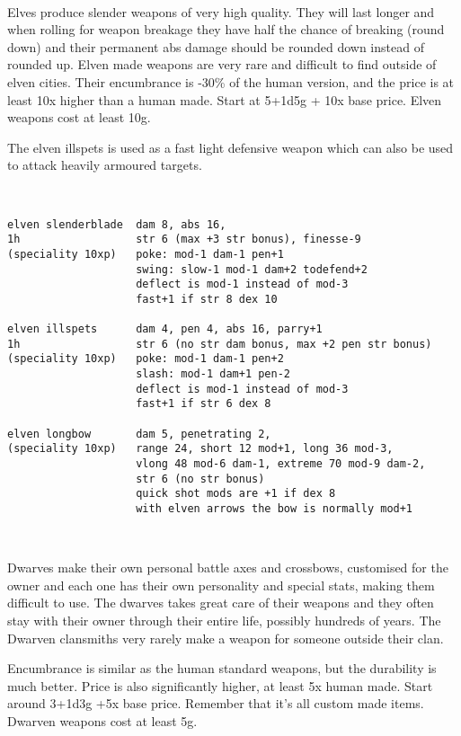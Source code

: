 \

\goodbreak
\noindent Elves produce slender weapons of very high quality. They will last longer and when rolling for weapon breakage they have half the chance of breaking (round down) and their permanent abs damage should be rounded down instead of rounded up. Elven made weapons are very rare and difficult to find outside of elven cities. Their encumbrance is -30\% of the human version, and the price is at least 10x higher than a human made. Start at 5+1d5g + 10x base price. Elven weapons cost at least 10g.

The elven illspets is used as a fast light defensive weapon which can also be used to attack heavily armoured targets.

\

\small \begin{verbatim}
elven slenderblade  dam 8, abs 16,
1h                  str 6 (max +3 str bonus), finesse-9
(speciality 10xp)   poke: mod-1 dam-1 pen+1
                    swing: slow-1 mod-1 dam+2 todefend+2
                    deflect is mod-1 instead of mod-3
                    fast+1 if str 8 dex 10

elven illspets      dam 4, pen 4, abs 16, parry+1
1h                  str 6 (no str dam bonus, max +2 pen str bonus)
(speciality 10xp)   poke: mod-1 dam-1 pen+2
                    slash: mod-1 dam+1 pen-2
                    deflect is mod-1 instead of mod-3
                    fast+1 if str 6 dex 8

elven longbow       dam 5, penetrating 2,
(speciality 10xp)   range 24, short 12 mod+1, long 36 mod-3,
                    vlong 48 mod-6 dam-1, extreme 70 mod-9 dam-2,
                    str 6 (no str bonus)
                    quick shot mods are +1 if dex 8
                    with elven arrows the bow is normally mod+1
\end{verbatim} \normalsize

\

\goodbreak
\noindent Dwarves make their own personal battle axes and crossbows, customised for the owner and each one has their own personality and special stats, making them difficult to use. The dwarves takes great care of their weapons and they often stay with their owner through their entire life, possibly hundreds of years. The Dwarven clansmiths very rarely make a weapon for someone outside their clan.

Encumbrance is similar as the human standard weapons, but the durability is much better. Price is also significantly higher, at least 5x human made. Start around 3+1d3g +5x base price. Remember that it's all custom made items. Dwarven weapons cost at least 5g.

